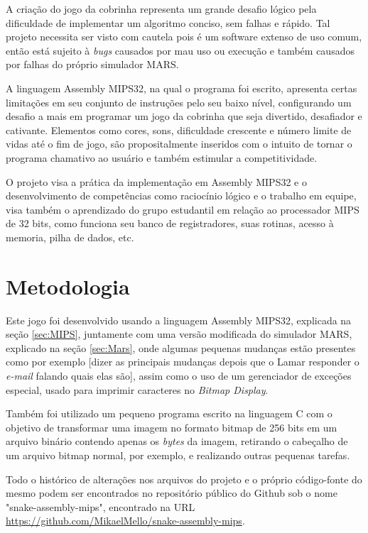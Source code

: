 \documentclass[a4paper]{sbgames}
\begin{document}
	A criação do jogo da cobrinha representa um grande desafio lógico pela dificuldade de implementar um algoritmo conciso, sem falhas e rápido. Tal projeto necessita ser visto com cautela pois é um software extenso de uso comum, então está sujeito à \textit{bugs} causados por mau uso ou execução e também causados por falhas do próprio simulador MARS. 
    
	A linguagem Assembly MIPS32, na qual o programa foi escrito, apresenta certas limitações em seu conjunto de instruções pelo seu baixo nível, configurando um desafio a mais em programar um jogo da cobrinha que seja divertido, desafiador e cativante.  Elementos como cores, sons, dificuldade crescente e número limite de vidas até o fim de jogo, são propositalmente inseridos com o intuito de tornar o programa chamativo ao usuário e também estimular a competitividade.

	O projeto visa a prática da implementação em Assembly MIPS32 e o desenvolvimento de competências como raciocínio lógico e o trabalho em equipe, visa também o aprendizado do grupo estudantil em relação ao processador MIPS de 32 bits, como funciona seu banco de registradores, suas rotinas, acesso à memoria, pilha de dados, etc.

    

\section{Metodologia}
\label{sec:Metodologia}

Este jogo foi desenvolvido usando a linguagem Assembly MIPS32, explicada na seção \ref{sec:MIPS}, juntamente com uma versão modificada do simulador MARS, explicado na seção \ref{sec:Mars}, onde algumas pequenas mudanças estão presentes como por exemplo [dizer as principais mudanças depois que o Lamar responder o \textit{e-mail} falando quais elas são], assim como o uso de um gerenciador de exceções especial, usado para imprimir caracteres no \textit{Bitmap Display}.

Também foi utilizado um pequeno programa escrito na linguagem C com o objetivo de transformar uma imagem no formato bitmap de 256 bits em um arquivo binário contendo apenas os \textit{bytes} da imagem, retirando o cabeçalho de um arquivo bitmap normal, por exemplo, e realizando outras pequenas tarefas.

Todo o histórico de alterações nos arquivos do projeto e o próprio código-fonte do mesmo podem ser encontrados no repositório público do Github sob o nome "snake-assembly-mips", encontrado na URL \url{https://github.com/MikaelMello/snake-assembly-mips}.
\end{document}
